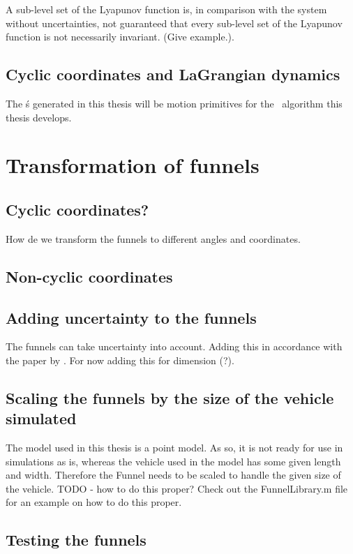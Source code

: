 A sub-level set of the Lyapunov function is, in comparison with the system
without uncertainties, not guaranteed that every sub-level set of the Lyapunov
function is not necessarily invariant. (Give example.).

\subsection{Cyclic coordinates and LaGrangian dynamics}

The \funnel\'s generated in this thesis will be motion primitives for the
\rrtfunnel\ algorithm this thesis develops.


\section{Transformation of funnels}

\subsection{Cyclic coordinates?}

How de we transform the funnels to different angles and coordinates.

\subsection{Non-cyclic coordinates}

\subsection{Adding uncertainty to the funnels}

The funnels can take uncertainty into account. Adding this in accordance with
the paper by \cite{majumedar2013}. For now adding this for dimension (?).

\subsection{Scaling the funnels by the size of the vehicle simulated}

The model used in this thesis is a point model. As so, it is not ready for use
in simulations as is, whereas the vehicle used in the model has some given
length and width. Therefore the Funnel needs to be scaled to handle the given
size of the vehicle. TODO - how to do this proper? Check out the FunnelLibrary.m
file for an example on how to do this proper.

\subsection{Testing the funnels}

